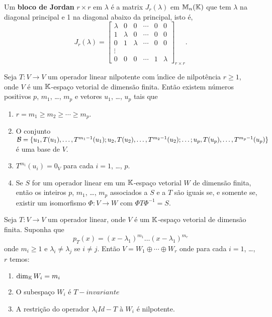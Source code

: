 \begin{definicao}
	Um \textbf{bloco de Jordan} $r \times r$ em $\lambda$ \'e a matrix $J_r(\lambda)$ em $\mathbb{M}_n(\mathbb{K})$ que tem $\lambda$ na diagonal principal e 1 na diagonal abaixo da principal, isto \'e,
	\[
	J_r(\lambda) = \begin{bmatrix}
		\lambda & 0 & 0 & \cdots & 0 & 0\\
		1 & \lambda & 0 & \cdots & 0 & 0\\
		0 & 1 & \lambda & \cdots & 0 & 0\\
		\vdots\\
		0 & 0 & 0 & \cdots & 1 & \lambda
	\end{bmatrix}_{r \times r}.
\]
\end{definicao}

\begin{teorema}\label{operadornilpotente}
	Seja $T : V \to V$ um operador linear nilpotente com {\'\i}ndice de nilpot\^encia $r \ge 1$, onde $V$ \'e um $\mathbb{K}$-espa\c{c}o vetorial de dimens\~ao finita. Ent\~ao existem n\'umeros positivos $p$, $m_1$, \dots, $m_p$ e vetores $u_1$, \dots, $u_p$ tais que
	\begin{enumerate}[label={\roman*})]
		\item $r = m_1 \ge m_2 \ge \cdots \ge m_p$.
		\item O conjunto $\mathcal{B} = \{u_1, T(u_1), \dots, T^{m_1 - 1}(u_1); u_2, T(u_2), \dots, T^{m_2 - 1}(u_2); \dots; u_p, T(u_p), \dots, \linebreak T^{m_p - 1}(u_p)\}$ \'e uma base de $V$.
		\item $T^{m_i}(u_i) = 0_V$ para cada $i = 1$, \dots, $p$.
		\item Se $S$ for um operador linear em um $\mathbb{K}$-espa\c{c}o vetorial $W$ de dimens\~ao finita, ent\~ao os inteiros $p$, $m_1$, \dots, $m_p$ associados a $S$ e a $T$ s\~ao iguais se, e somente se, existir um isomorfismo $\Phi : V \to W$ com $\Phi T \Phi^{-1} = S$.
	\end{enumerate}
\end{teorema}

\begin{teorema}\label{formadejordan}
	Seja $T : V \to V$ um operador linear, onde $V$ \'e um $\mathbb{K}$-espa\c{c}o vetorial de dimens\~ao finita. Suponha que
	\[
		p_T(x) = (x - \lambda_1)^{m_1}\dots(x - \lambda_1)^{m_r}
	\]
	onde $m_i \ge 1$ e $\lambda_i \ne \lambda_j$ se $i \ne j$. Ent\~ao $V = W_1 \oplus \cdots \oplus W_r$ onde para cada $i = 1$, \dots, $r$ temos:
	\begin{enumerate}[label={\roman*})]
		\item $\dim_{\mathbb{K}} W_i = m_i$
		\item O subespa\c{c}o $W_i$ \'e $T-invariante$
		\item A restri\c{c}\~ao do operador $\lambda_i Id - T$ \`a $W_i$ \'e nilpotente.
	\end{enumerate}
\end{teorema}

